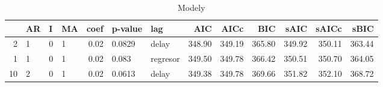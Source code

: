 \begin{table}[ht]
\centering
\begin{tabular}{rlllrllrrrrrr}
  \hline
 & AR & I & MA & coef & p-value & lag & AIC & AICc & BIC & sAIC & sAICc & sBIC \\ 
  \hline
2 & 1 & 0 & 1 & 0.02 & 0.0829 & delay & 348.90 & 349.19 & 365.80 & 349.92 & 350.11 & 363.44 \\ 
  1 & 1 & 0 & 1 & 0.02 & 0.083 & regresor & 349.50 & 349.78 & 366.42 & 350.51 & 350.70 & 364.05 \\ 
  10 & 2 & 0 & 1 & 0.02 & 0.0613 & delay & 349.38 & 349.78 & 369.66 & 351.82 & 352.10 & 368.72 \\ 
   \hline
\end{tabular}
\caption{Modely} 
\end{table}
